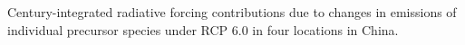 Century-integrated radiative forcing contributions due to changes in emissions of individual precursor species under RCP 6.0 in four locations in China.~\label{fig:intrfchina}
